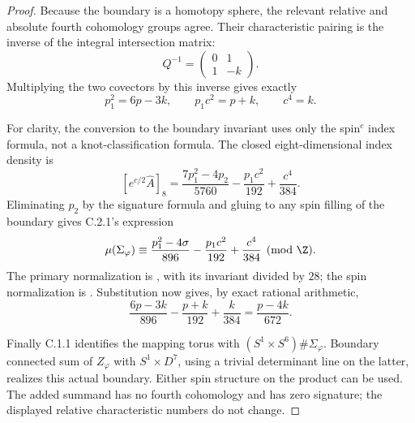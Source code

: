 \begin{proof}
Because the boundary is a homotopy sphere, the relevant relative
and absolute fourth cohomology groups agree. Their characteristic
pairing is the inverse of the integral intersection matrix:
\[
 Q^{-1}=\begin{pmatrix}0&1\\1&-k\end{pmatrix}.
\]
Multiplying the two covectors by this inverse gives exactly
\[
 p_1^2=6p-3k,\qquad p_1c^2=p+k,\qquad c^4=k.
\]

For clarity, the conversion to the boundary invariant uses only
the spin$^c$ index formula, not a knot-classification formula.
The closed eight-dimensional index density is
\[
 [e^{c/2}\widehat A]_8
 =\frac{7p_1^2-4p_2}{5760}
       -\frac{p_1c^2}{192}+\frac{c^4}{384}.
\]
Eliminating $p_2$ by the signature formula and gluing to any spin
filling of the boundary gives C.2.1's expression
\[
 \mu(\Sigma_\varphi)\equiv
 \frac{p_1^2-4\sigma}{896}
 -\frac{p_1c^2}{192}+\frac{c^4}{384}\pmod\Z.
\]
The primary normalization is
\citet[Section 2.2, equation (2.1)]{CrowleyNordstrom2020},
with its invariant divided by $28$; the spin normalization is
\citet[Section 6, equation (11)]{EellsKuiper1962}.
Substitution now gives, by exact rational arithmetic,
\[
 \frac{6p-3k}{896}-\frac{p+k}{192}+\frac{k}{384}
       =\frac{p-4k}{672}.
\]

Finally C.1.1 identifies the mapping torus with
$(S^1\times S^6)\#\Sigma_\varphi$. Boundary connected sum
of $Z_\varphi$ with $S^1\times D^7$, using a trivial determinant
line on the latter, realizes this actual boundary. Either spin
structure on the product can be used. The added summand has no
fourth cohomology and has zero signature; the displayed relative
characteristic numbers do not change.
\end{proof}

